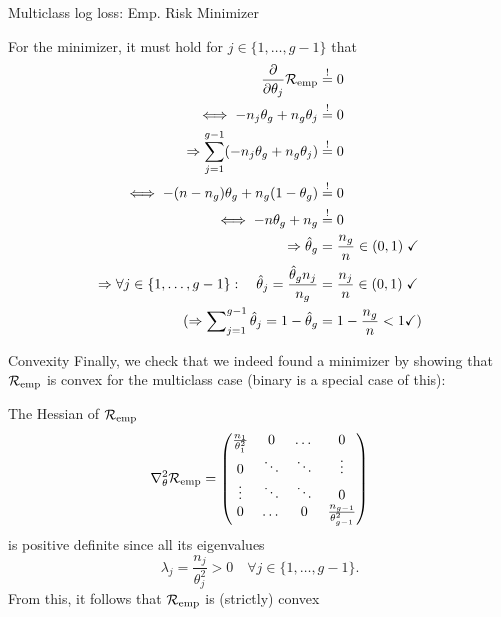 \documentclass[11pt,compress,t,notes=noshow, xcolor=table]{beamer}
\begin{document}
\begin{frame}{Multiclass log loss: Emp. Risk Minimizer}

For the minimizer, it must hold for $j \in \{1,\dots,g-1\}$ that
\begin{align*}
\frac{\partial}{\partial \theta_j}\mathcal{R}_{\text{emp}}  & \overset{!}{=}  0 \\
\iff  -n_j\theta_g + n_g\theta_j & \overset{!}{=}  0 \\
\Rightarrow \sum^{g-1}_{j=1}( -n_j\theta_g + n_g\theta_j) & \overset{!}{=}  0 \\
\iff -(n-n_g)\theta_g + n_g(1-\theta_g) & \overset{!}{=}  0 \\
\iff -n\theta_g + n_g & \overset{!}{=}  0 \\
\Rightarrow \hat{\theta}_g  &= \frac{n_g}{n}   \in (0,1)\; \checkmark \\
\Rightarrow   \forall j \in \{1,\dots,g-1\}:\quad \hat{\theta}_j =  \frac{\hat{\theta}_gn_j}{n_g} &=  \frac{n_j}{n}     \in (0,1)\; \checkmark \\
(\Rightarrow \sum\nolimits^{g-1}_{j=1}\hat{\theta}_j = 1- \hat{\theta}_g &= 1 - \frac{n_g}{n} < 1 \checkmark
)
\end{align*}

\end{frame}

\begin{frame}{Convexity}
Finally, we check that we indeed found a minimizer by showing that $\mathcal{R}_{\text{emp}}$ is convex for the multiclass case (binary is a special case of this):

\vfill

The Hessian of $\mathcal{R}_{\text{emp}}$
$$
\nabla^2_\theta\mathcal{R}_{\text{emp}}   =  \begin{pmatrix}\frac{n_1}{\theta_1^2} & 0 & \dots & 0 \\
0 & \ddots & \ddots & \vdots \\
\vdots & \ddots & \ddots & 0 \\
0 & \dots & 0 & \frac{n_{g-1}}{\theta_{g-1}^2}
\end{pmatrix} 
$$
is positive definite since all its eigenvalues $$\lambda_j = \frac{n_j}{\theta_j^2} > 0 \quad \forall j \in\{1,\dots,g-1\}.$$ 
From this, it follows that $\mathcal{R}_{\text{emp}}$ is (strictly) convex
\end{frame}



\endlecture
\end{document}
